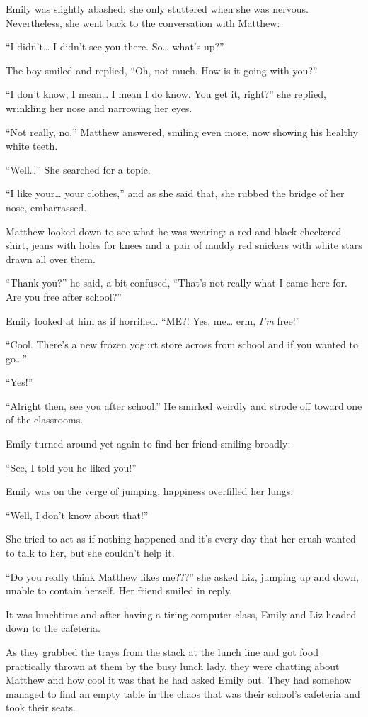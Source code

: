 Emily was slightly abashed: she only stuttered when she was nervous. Nevertheless, she went back to the conversation with Matthew:

“I didn't… I didn't see you there. So… what's up?”

The boy smiled and replied, “Oh, not much. How is it going with you?”

“I don't know, I mean… I mean I do know. You get it, right?” she replied, wrinkling her nose and narrowing her eyes.

“Not really, no,” Matthew answered, smiling even more, now showing his healthy white teeth.

“Well…” She searched for a topic.

“I like your… your clothes,” and as she said that, she rubbed the bridge of her nose, embarrassed.

Matthew looked down to see what he was wearing: a red and black checkered shirt, jeans with holes for knees and a pair of muddy red snickers with white stars drawn all over them.

“Thank you?” he said, a bit confused, “That's not really what I came here for. Are you free after school?”

Emily looked at him as if horrified. “ME?! Yes, me… erm, \textit{I'm} free!”

“Cool. There's a new frozen yogurt store across from school and if you wanted to go…”

“Yes!”

“Alright then, see you after school.” He smirked weirdly and strode off toward one of the classrooms.

Emily turned around yet again to find her friend smiling broadly:

“See, I told you he liked you!”

Emily was on the verge of jumping, happiness overfilled her lungs.

“Well, I don't know about that!”

She tried to act as if nothing happened and it's every day that her crush wanted to talk to her, but she couldn't help it.

“Do you really think Matthew likes me???” she asked Liz, jumping up and down, unable to contain herself. Her friend smiled in reply.

\bigskip

It was lunchtime and after having a tiring computer class, Emily and Liz headed down to the cafeteria.

As they grabbed the trays from the stack at the lunch line and got food practically thrown at them by the busy lunch lady, they were chatting about Matthew and how cool it was that he had asked Emily out.
They had somehow managed to find an empty table in the chaos that was their school's cafeteria and took their seats.

